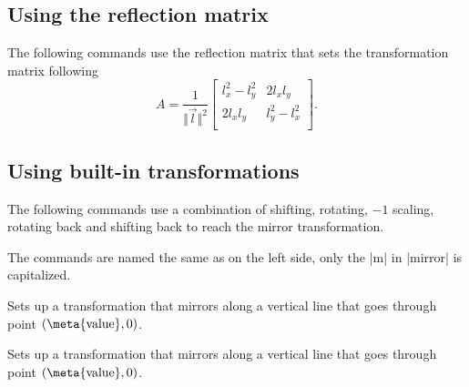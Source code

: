 \begin{paracol}{2}

\subsection{Using the reflection matrix}

The following commands use the reflection matrix that sets the transformation matrix following
\begin{equation*}
  A = \frac{1}{\Vert\vec l\Vert^2} \begin{bmatrix}
  l_x^2-l_y^2 & 2l_xl_y \\
  2l_xl_y & l_y^2-l_x^2\\
  \end{bmatrix}.
\end{equation*}

\switchcolumn%

\subsection{Using built-in transformations}

The following commands use a combination of shifting, rotating, $-1$ scaling,
rotating back and shifting back to reach the mirror transformation.

The commands are named the same as on the left side,
only the |m| in |mirror| is capitalized.

\switchcolumn*%

\begin{command}{\pgftransformxmirror{}}
  Sets up a transformation that mirrors along a vertical line that goes through point $(\text{\meta{value}}, 0)$.

\begin{codeexample}[preamble=\usepgflibrary{transformations.mirror}]
\end{codeexample}
\end{command}

\switchcolumn%

\begin{command}{\pgftransformxMirror{}}
  Sets up a transformation that mirrors along a vertical line that goes through point $(\text{\meta{value}}, 0)$.


\end{command}
\end{paracol}
